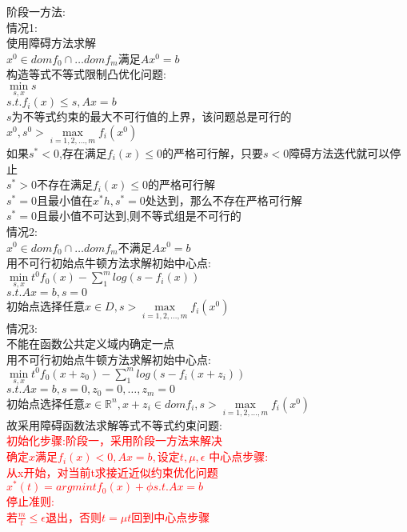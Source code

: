 \documentclass{article}
\begin{document}
阶段一方法:\\
情况1:\\
使用障碍方法求解\\
$x^0 \in domf_0 \cap \dots dom f_m $满足$Ax^0 = b$\\
构造等式不等式限制凸优化问题:\\
$\min\limits_{s,x} s$\\
$s.t. f_i(x) \leq s,Ax = b$\\
$s$为不等式约束的最大不可行值的上界，该问题总是可行的$x^0,s^0 > \max\limits_{i = 1,2,\dots,m}f_i(x^0)$\\
如果$s^* <0$,存在满足$f_i(x) \leq 0$的严格可行解，只要$s<0$障碍方法迭代就可以停止\\
$s^* >0$不存在满足$f_i(x) \leq 0$的严格可行解\\
$s^* =0$且最小值在$x^*h,s^* = 0$处达到，那么不存在严格可行解\\
$s^* =0$且最小值不可达到,则不等式组是不可行的\\
情况2:\\
$x^0 \in domf_0 \cap \dots dom f_m $不满足$Ax^0 = b$\\
用不可行初始点牛顿方法求解初始中心点:\\
$\min \limits_{s,x} t^0f_0(x) - \sum_{1}^{m}log(s - f_i(x))$\\
$s.t.Ax = b,s = 0$\\
初始点选择任意$x\in D,s >  \max\limits_{i = 1,2,\dots,m}f_i(x^0)$\\
情况3:\\
不能在函数公共定义域内确定一点\\
用不可行初始点牛顿方法求解初始中心点:\\
$\min \limits_{s,x} t^0f_0(x+z_0) - \sum_{1}^{m}log(s - f_i(x+z_i))$\\
$s.t.Ax = b,s = 0,z_0 = 0,\dots,z_m = 0$\\
初始点选择任意$x\in \mathbb{R}^n,x + z_i \in dom f_i,s >  \max\limits_{i = 1,2,\dots,m}f_i(x^0)$\\
故采用障碍函数法求解等式不等式约束问题:\\
\textcolor{red}{
初始化步骤:阶段一，采用阶段一方法来解决\\
确定$x$满足$f_i(x) < 0,Ax = b,$设定$t,\mu,\epsilon$
中心点步骤:\\
从x开始，对当前t求接近近似约束优化问题$x^*(t) = argmin tf_0(x) + \phi s.t.Ax = b$\\
停止准则:\\
若$\frac{m}{t} \leq \epsilon$退出，否则$t = \mu t$回到中心点步骤\\
}
\end{document}
